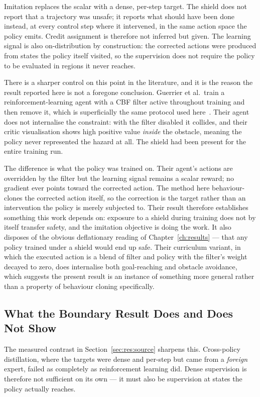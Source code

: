 Imitation replaces the scalar with a dense, per-step target. The shield does not report that a
trajectory was unsafe; it reports what should have been done instead, at every control step where
it intervened, in the same action space the policy emits. Credit assignment is therefore not
inferred but given. The learning signal is also on-distribution by construction: the corrected
actions were produced from states the policy itself visited, so the supervision does not require
the policy to be evaluated in regions it never reaches.

There is a sharper control on this point in the literature, and it is the reason the result
reported here is not a foregone conclusion. Guerrier et al.\ train a reinforcement-learning agent
with a CBF filter active throughout training and then remove it, which is superficially the same
protocol used here~\cite{guerrier2025guardrails}. Their agent does not internalise the constraint:
with the filter disabled it collides, and their critic visualisation shows high positive value
\emph{inside} the obstacle, meaning the policy never represented the hazard at all. The shield had
been present for the entire training run.

The difference is what the policy was trained on. Their agent's actions are overridden by the
filter but the learning signal remains a scalar reward; no gradient ever points toward the
corrected action. The method here behaviour-clones the corrected action itself, so the correction
is the target rather than an intervention the policy is merely subjected to. Their result therefore
establishes something this work depends on: exposure to a shield during training does not by itself
transfer safety, and the imitation objective is doing the work. It also disposes of the obvious
deflationary reading of Chapter~\ref{ch:results} --- that any policy trained under a shield would
end up safe. Their curriculum variant, in which the executed action is a blend of filter and policy
with the filter's weight decayed to zero, does internalise both goal-reaching and obstacle
avoidance, which suggests the present result is an instance of something more general rather than a
property of behaviour cloning specifically.

\subsection*{What the Boundary Result Does and Does Not Show}

The measured contrast in Section~\ref{sec:res:source} sharpens this. Cross-policy distillation,
where the targets were dense and per-step but came from a \emph{foreign} expert, failed as
completely as reinforcement learning did. Dense supervision is therefore not sufficient on its own
--- it must also be supervision at states the policy actually reaches.

